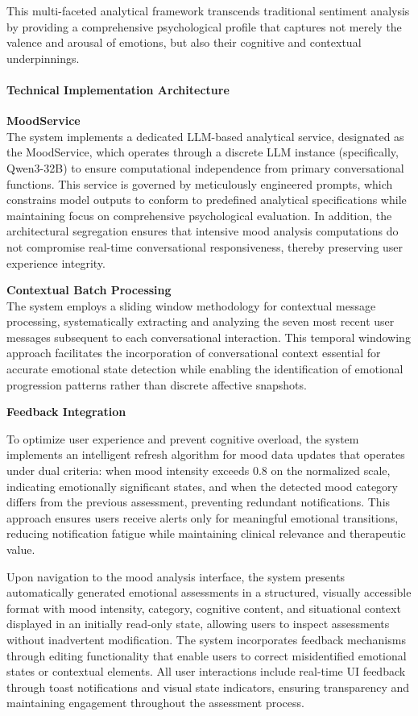 This multi-faceted analytical framework transcends traditional sentiment analysis by providing a comprehensive psychological profile that captures not merely the valence and arousal of emotions, but also their cognitive and contextual underpinnings.

\paragraph{Technical Implementation Architecture}

\textbf{MoodService }\\
The system implements a dedicated LLM-based analytical service, designated as the MoodService, which operates through a discrete LLM instance (specifically, Qwen3-32B) to ensure computational independence from primary conversational functions. This service is governed by meticulously engineered prompts, which constrains model outputs to conform to predefined analytical specifications while maintaining focus on comprehensive psychological evaluation. In addition, the architectural segregation  ensures that intensive mood analysis computations do not compromise real-time conversational responsiveness, thereby preserving user experience integrity.

\textbf{Contextual Batch Processing}\\
The system employs a sliding window methodology for contextual message processing, systematically extracting and analyzing the seven most recent user messages subsequent to each conversational interaction. This temporal windowing approach facilitates the incorporation of conversational context essential for accurate emotional state detection while enabling the identification of emotional progression patterns rather than discrete affective snapshots. 

\textbf{Feedback Integration}

To optimize user experience and prevent cognitive overload, the system implements an intelligent refresh algorithm for mood data updates that operates under dual criteria: when mood intensity exceeds 0.8 on the normalized scale, indicating emotionally significant states, and when the detected mood category differs from the previous assessment, preventing redundant notifications. This approach ensures users receive alerts only for meaningful emotional transitions, reducing notification fatigue while maintaining clinical relevance and therapeutic value.

Upon navigation to the mood analysis interface, the system presents automatically generated emotional assessments in a structured, visually accessible format with mood intensity, category, cognitive content, and situational context displayed in an initially read-only state, allowing users to inspect assessments without inadvertent modification. The system incorporates feedback mechanisms through editing functionality that enable users to correct misidentified emotional states or contextual elements. All user interactions include real-time UI feedback through toast notifications and visual state indicators, ensuring transparency and maintaining engagement throughout the assessment process.

